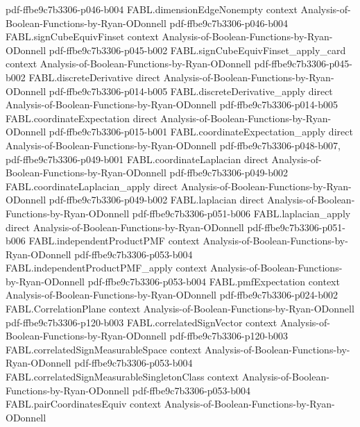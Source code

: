 \begin{theorem}
  {pdf-ffbe9c7b3306-p046-b004}
\proofstep
  {FABL.dimensionEdgeNonempty}
  {context}
  {Analysis-of-Boolean-Functions-by-Ryan-ODonnell}
  {pdf-ffbe9c7b3306-p046-b004}
\proofstep
  {FABL.signCubeEquivFinset}
  {context}
  {Analysis-of-Boolean-Functions-by-Ryan-ODonnell}
  {pdf-ffbe9c7b3306-p045-b002}
\proofstep
  {FABL.signCubeEquivFinset_apply_card}
  {context}
  {Analysis-of-Boolean-Functions-by-Ryan-ODonnell}
  {pdf-ffbe9c7b3306-p045-b002}
\proofstep
  {FABL.discreteDerivative}
  {direct}
  {Analysis-of-Boolean-Functions-by-Ryan-ODonnell}
  {pdf-ffbe9c7b3306-p014-b005}
\proofstep
  {FABL.discreteDerivative_apply}
  {direct}
  {Analysis-of-Boolean-Functions-by-Ryan-ODonnell}
  {pdf-ffbe9c7b3306-p014-b005}
\proofstep
  {FABL.coordinateExpectation}
  {direct}
  {Analysis-of-Boolean-Functions-by-Ryan-ODonnell}
  {pdf-ffbe9c7b3306-p015-b001}
\proofstep
  {FABL.coordinateExpectation_apply}
  {direct}
  {Analysis-of-Boolean-Functions-by-Ryan-ODonnell}
  {pdf-ffbe9c7b3306-p048-b007,
    pdf-ffbe9c7b3306-p049-b001}
\proofstep
  {FABL.coordinateLaplacian}
  {direct}
  {Analysis-of-Boolean-Functions-by-Ryan-ODonnell}
  {pdf-ffbe9c7b3306-p049-b002}
\proofstep
  {FABL.coordinateLaplacian_apply}
  {direct}
  {Analysis-of-Boolean-Functions-by-Ryan-ODonnell}
  {pdf-ffbe9c7b3306-p049-b002}
\proofstep
  {FABL.laplacian}
  {direct}
  {Analysis-of-Boolean-Functions-by-Ryan-ODonnell}
  {pdf-ffbe9c7b3306-p051-b006}
\proofstep
  {FABL.laplacian_apply}
  {direct}
  {Analysis-of-Boolean-Functions-by-Ryan-ODonnell}
  {pdf-ffbe9c7b3306-p051-b006}
\proofstep
  {FABL.independentProductPMF}
  {context}
  {Analysis-of-Boolean-Functions-by-Ryan-ODonnell}
  {pdf-ffbe9c7b3306-p053-b004}
\proofstep
  {FABL.independentProductPMF_apply}
  {context}
  {Analysis-of-Boolean-Functions-by-Ryan-ODonnell}
  {pdf-ffbe9c7b3306-p053-b004}
\proofstep
  {FABL.pmfExpectation}
  {context}
  {Analysis-of-Boolean-Functions-by-Ryan-ODonnell}
  {pdf-ffbe9c7b3306-p024-b002}
\proofstep
  {FABL.CorrelationPlane}
  {context}
  {Analysis-of-Boolean-Functions-by-Ryan-ODonnell}
  {pdf-ffbe9c7b3306-p120-b003}
\proofstep
  {FABL.correlatedSignVector}
  {context}
  {Analysis-of-Boolean-Functions-by-Ryan-ODonnell}
  {pdf-ffbe9c7b3306-p120-b003}
\proofstep
  {FABL.correlatedSignMeasurableSpace}
  {context}
  {Analysis-of-Boolean-Functions-by-Ryan-ODonnell}
  {pdf-ffbe9c7b3306-p053-b004}
\proofstep
  {FABL.correlatedSignMeasurableSingletonClass}
  {context}
  {Analysis-of-Boolean-Functions-by-Ryan-ODonnell}
  {pdf-ffbe9c7b3306-p053-b004}
\proofstep
  {FABL.pairCoordinatesEquiv}
  {context}
  {Analysis-of-Boolean-Functions-by-Ryan-ODonnell}

\end{theorem}

